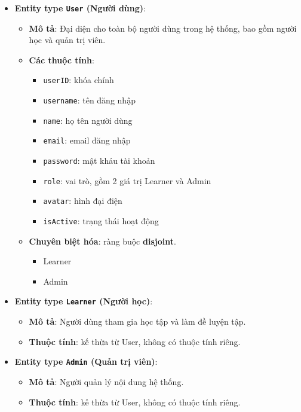 \begin{itemize}

\item \textbf{Entity type \texttt{User} (Người dùng)}:
\begin{itemize}
    \item \textbf{Mô tả}: Đại diện cho toàn bộ người dùng trong hệ thống, bao gồm người học và quản trị viên.
    
    \item \textbf{Các thuộc tính}:
    \begin{itemize}
        \item \texttt{userID}: khóa chính
        \item \texttt{username}: tên đăng nhập
        \item \texttt{name}: họ tên người dùng
        \item \texttt{email}: email đăng nhập
        \item \texttt{password}: mật khảu tài khoản
        \item \texttt{role}: vai trò, gồm 2 giá trị Learner và Admin
        \item \texttt{avatar}: hình đại điện
        \item \texttt{isActive}: trạng thái hoạt động
    \end{itemize}

    \item \textbf{Chuyên biệt hóa}: ràng buộc \textbf{disjoint}.
    \begin{itemize}
        \item Learner
        \item Admin
    \end{itemize}
\end{itemize}


\item \textbf{Entity type \texttt{Learner} (Người học)}:
\begin{itemize}
    \item \textbf{Mô tả}: Người dùng tham gia học tập và làm đề luyện tập.
    \item \textbf{Thuộc tính}: kế thừa từ User, không có thuộc tính riêng.
\end{itemize}


\item \textbf{Entity type \texttt{Admin} (Quản trị viên)}:
\begin{itemize}
    \item \textbf{Mô tả}: Người quản lý nội dung hệ thống.
    \item \textbf{Thuộc tính}: kế thừa từ User, không có thuộc tính riêng.
\end{itemize}



\end{itemize}
